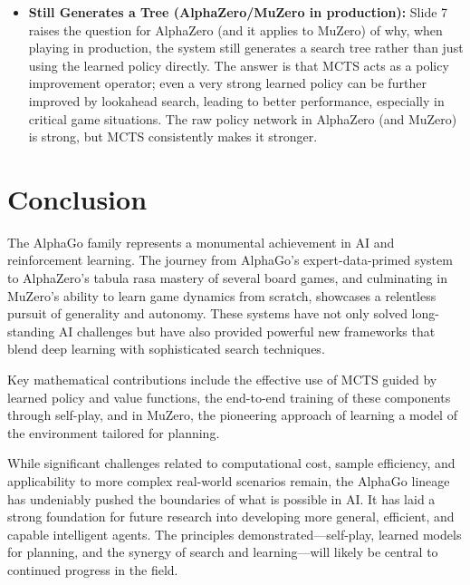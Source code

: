 \documentclass[11pt,a4paper]{article}
\begin{document}
\begin{itemize}
    \item \textbf{Still Generates a Tree (AlphaZero/MuZero in production):} Slide 7 raises the question for AlphaZero (and it applies to MuZero) of why, when playing in production, the system still generates a search tree rather than just using the learned policy directly. The answer is that MCTS acts as a policy improvement operator; even a very strong learned policy can be further improved by lookahead search, leading to better performance, especially in critical game situations. The raw policy network in AlphaZero (and MuZero) is strong, but MCTS consistently makes it stronger.
\end{itemize}

\section{Conclusion}
The AlphaGo family represents a monumental achievement in AI and reinforcement learning. The journey from AlphaGo's expert-data-primed system to AlphaZero's tabula rasa mastery of several board games, and culminating in MuZero's ability to learn game dynamics from scratch, showcases a relentless pursuit of generality and autonomy. These systems have not only solved long-standing AI challenges but have also provided powerful new frameworks that blend deep learning with sophisticated search techniques.

Key mathematical contributions include the effective use of MCTS guided by learned policy and value functions, the end-to-end training of these components through self-play, and in MuZero, the pioneering approach of learning a model of the environment tailored for planning.

While significant challenges related to computational cost, sample efficiency, and applicability to more complex real-world scenarios remain, the AlphaGo lineage has undeniably pushed the boundaries of what is possible in AI. It has laid a strong foundation for future research into developing more general, efficient, and capable intelligent agents. The principles demonstrated—self-play, learned models for planning, and the synergy of search and learning—will likely be central to continued progress in the field.

\clearpage

\nocite{*}
\printbibliography%
\end{document}
